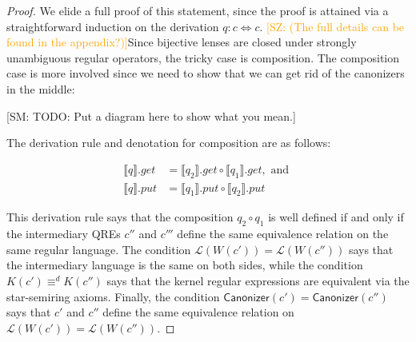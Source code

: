 \documentclass{svproc}
\newcommand{\FINISH}[3]{\ifdraft\textcolor{#1}{[#2: #3]}\fi}
\newcommand{\saz}[1]{\FINISH{orange}{SZ}{#1}}
\newcommand{\sam}[1]{\FINISH{dkpurple}{SM}{#1}}
\newcommand{\kw}[1]{\ensuremath{\mathsf{#1}}}
\newcommand{\canonizer}{\ensuremath{\kw{Canonizer}}}
\begin{document}
\begin{proof} 
We elide a full proof of this statement, since the proof is attained via a
straightforward induction on the derivation $q : c \Leftrightarrow c$. \saz{(The
  full details can be found in the appendix?)}Since
bijective lenses are closed under strongly unambiguous regular operators, the
tricky case is composition. The composition case is more involved since we need
to show that we can get rid of the canonizers in the middle:

\sam{TODO: Put a diagram here to show what you mean.}

The derivation rule and denotation for composition are as follows:
  \begin{prooftree}
\end{prooftree}

\begin{align*}
  \llbracket q \rrbracket.get &= \llbracket q_2 \rrbracket.get\circ \llbracket
  q_1 \rrbracket.get, \text{ and }\\
  \llbracket q \rrbracket.put &= \llbracket q_1 \rrbracket.put \circ \llbracket
  q_2 \rrbracket.put
  \end{align*}
  
This derivation rule says that the composition $q_2 \circ q_1$ is well defined
if and only if the intermediary QREs $c''$ and $c'''$ define the same
equivalence relation on the same regular language. The condition
$\mathcal{L}(W(c')) = \mathcal{L}(W(c''))$ says that the intermediary language
is the same on both sides, while the condition $K(c') \equiv^d K(c'')$ says that
the kernel regular expressions are equivalent via the star-semiring axioms.
Finally, the condition $\canonizer(c') = \canonizer(c'')$ says
that $c'$ and $c''$ define the same equivalence relation on $\mathcal{L}(W(c'))=
\mathcal{L}(W(c''))$.


\end{proof}
\end{document}
